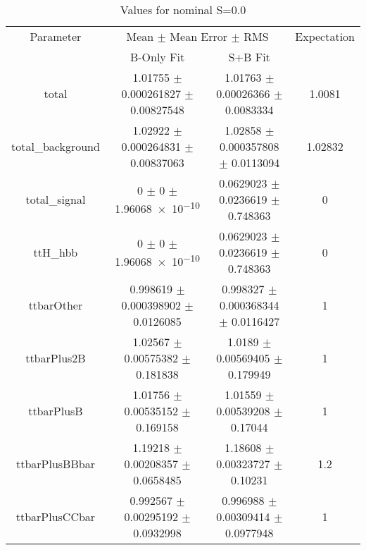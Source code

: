 \begin{table}
\centering
\caption{Values for nominal S=0.0}
\begin{tabular}{cccc}
\toprule
Parameter & \multicolumn{2}{c}{Mean $\pm$ Mean Error $\pm$ RMS} & Expectation\\
 & B-Only Fit & S+B Fit & \\
\midrule
total & \num{1.01755} $\pm$ \num{0.000261827} $\pm$ \num{0.00827548} & \num{1.01763} $\pm$ \num{0.00026366} $\pm$ \num{0.0083334} & \num{1.0081}\\
total\_background & \num{1.02922} $\pm$ \num{0.000264831} $\pm$ \num{0.00837063} & \num{1.02858} $\pm$ \num{0.000357808} $\pm$ \num{0.0113094} & \num{1.02832}\\
total\_signal & \num{0} $\pm$ \num{0} $\pm$ \num{1.96068e-10} & \num{0.0629023} $\pm$ \num{0.0236619} $\pm$ \num{0.748363} & \num{0}\\
ttH\_hbb & \num{0} $\pm$ \num{0} $\pm$ \num{1.96068e-10} & \num{0.0629023} $\pm$ \num{0.0236619} $\pm$ \num{0.748363} & \num{0}\\
ttbarOther & \num{0.998619} $\pm$ \num{0.000398902} $\pm$ \num{0.0126085} & \num{0.998327} $\pm$ \num{0.000368344} $\pm$ \num{0.0116427} & \num{1}\\
ttbarPlus2B & \num{1.02567} $\pm$ \num{0.00575382} $\pm$ \num{0.181838} & \num{1.0189} $\pm$ \num{0.00569405} $\pm$ \num{0.179949} & \num{1}\\
ttbarPlusB & \num{1.01756} $\pm$ \num{0.00535152} $\pm$ \num{0.169158} & \num{1.01559} $\pm$ \num{0.00539208} $\pm$ \num{0.17044} & \num{1}\\
ttbarPlusBBbar & \num{1.19218} $\pm$ \num{0.00208357} $\pm$ \num{0.0658485} & \num{1.18608} $\pm$ \num{0.00323727} $\pm$ \num{0.10231} & \num{1.2}\\
ttbarPlusCCbar & \num{0.992567} $\pm$ \num{0.00295192} $\pm$ \num{0.0932998} & \num{0.996988} $\pm$ \num{0.00309414} $\pm$ \num{0.0977948} & \num{1}\\
\bottomrule
\end{tabular}
\end{table}